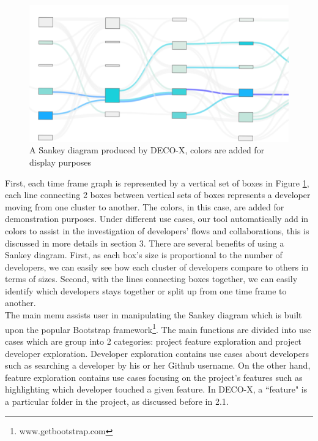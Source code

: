 \documentclass{article}
\begin{document}
\begin{figure}[h!]
\centering
\includegraphics[scale=0.4]{images/sankeySample.png}
\caption{A Sankey diagram produced by DECO-X, colors are added for display purposes}
\label{fig:sankeysample}
\end{figure}
First, each time frame graph is represented by a vertical set of boxes in Figure \ref{fig:sankeysample}, each line connecting 2 boxes between vertical sets of boxes represents a developer moving from one cluster to another. The colors, in this case, are added for demonstration purposes. Under different use cases, our tool automatically add in colors to assist in the investigation of developers' flows and collaborations, this is discussed in more details in section 3. There are several benefits of using a Sankey diagram. First, as each box's size is proportional to the number of developers, we can easily see how each cluster of developers compare to others in terms of sizes. Second, with the lines connecting boxes together, we can easily identify which developers stays together or split up from one time frame to another.\\
The main menu assists user in manipulating the Sankey diagram which is built upon the popular Bootstrap framework\footnote{www.getbootstrap.com}. The main functions are divided into use cases which are group into 2 categories: project feature exploration and project developer exploration. Developer exploration contains use cases about developers such as searching a developer by his or her Github username. On the other hand, feature exploration contains use cases focusing on the project's features such as highlighting which developer touched a given feature. In DECO-X, a ``feature" is a particular folder in the project, as discussed before in 2.1.\\
\end{document}
